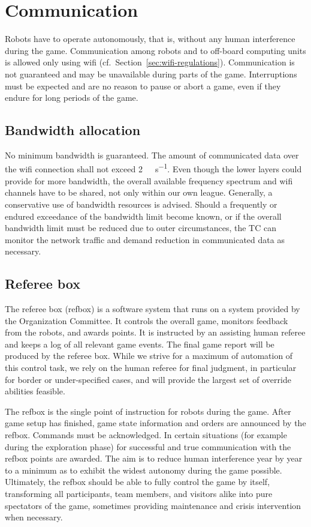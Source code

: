 \documentclass[12pt,twoside]{article}
\newcommand{\refsec}[1]{Section~\ref{#1}}
\begin{document}
\section{Communication}
\label{sec:communication}

Robots have to operate autonomously, that is, without any human
interference during the game. Communication among robots and to
off-board computing units is allowed only using wifi
(cf.~\refsec{sec:wifi-regulations}). Communication is not guaranteed
and may be unavailable during parts of the game. Interruptions must be
expected and are no reason to pause or abort a game, even if they
endure for long periods of the game.

\subsection{Bandwidth allocation}
\label{sec:bandwidth}
No minimum bandwidth is guaranteed. The amount of communicated data
over the wifi connection shall not exceed
\SI[per-mode=symbol]{2}{\mega\bit\per\second}. Even though the lower layers could
provide for more bandwidth, the overall available frequency spectrum
and wifi channels have to be shared, not only within our own
league. Generally, a conservative use of bandwidth resources is
advised. Should a frequently or endured exceedance of the bandwidth
limit become known, or if the overall bandwidth limit must be reduced
due to outer circumstances, the TC can monitor the network traffic and
demand reduction in communicated data as necessary.

\subsection{Referee box}
\label{sec:referee-box}
The referee box (refbox) is a software system that runs on a system
provided by the Organization Committee. It controls the overall game,
monitors feedback from the robots, and awards points. It is instructed
by an assisting human referee and keeps a log of all relevant game
events. The final game report will be produced by the referee
box. While we strive for a maximum of automation of this control task,
we rely on the human referee for final judgment, in particular for
border or under-specified cases, and will provide the largest set of
override abilities feasible.

The refbox is the single point of instruction for robots during the
game. After game setup has finished, game state information and orders
are announced by the refbox. Commands must be acknowledged. In certain
situations (for example during the exploration phase) for successful
and true communication with the refbox points are awarded. The aim is
to reduce human interference year by year to a minimum as to exhibit
the widest autonomy during the game possible. Ultimately, the refbox
should be able to fully control the game by itself, transforming all
participants, team members, and visitors alike into pure spectators of
the game, sometimes providing maintenance and crisis intervention when
necessary.
\end{document}
